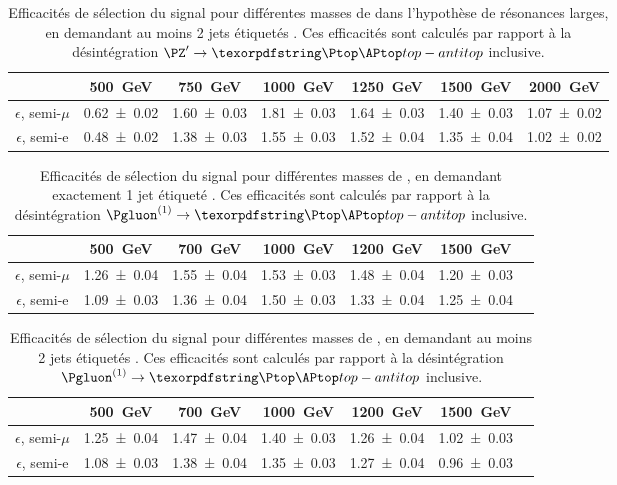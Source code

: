 \begin{table}[p!] \centering
  \begin{tabular}{ccccccc} \toprule
    & \SI{500}{\GeV} & \SI{750}{\GeV} & \SI{1000}{\GeV} & \SI{1250}{\GeV} & \SI{1500}{\GeV} & \SI{2000}{\GeV} \\ \midrule
    $\epsilon$, semi-$\mu$ & \num{0.62 \pm 0.02} & \num{1.60 \pm 0.03} & \num{1.81 \pm 0.03} & \num{1.64 \pm 0.03} & \num{1.40 \pm 0.03} & \num{1.07 \pm 0.02} \\
    $\epsilon$, semi-e & \num{0.48 \pm 0.02} & \num{1.38 \pm 0.03} & \num{1.55 \pm 0.03} & \num{1.52 \pm 0.04} & \num{1.35 \pm 0.04} & \num{1.02 \pm 0.02} \\ \bottomrule
  \end{tabular}
  \caption{Efficacités de sélection du signal pour différentes masses de \zprime dans l'hypothèse de résonances larges, en demandant au moins 2 jets étiquetés \Pbottom. Ces efficacités sont calculés par rapport à la désintégration $\zprime \rightarrow \ttbar$ inclusive.}
  \label{tab:eff_large_2b}
\end{table}

\begin{table}[p!] \centering
  \begin{tabular}{ccccccc} \toprule
    & \SI{500}{\GeV} & \SI{700}{\GeV} & \SI{1000}{\GeV} & \SI{1200}{\GeV} & \SI{1500}{\GeV} \\ \midrule
    $\epsilon$, semi-$\mu$ & \num{1.26 \pm 0.04} & \num{1.55 \pm 0.04} & \num{1.53 \pm 0.03} & \num{1.48 \pm 0.04} & \num{1.20 \pm 0.03} \\
    $\epsilon$, semi-e & \num{1.09 \pm 0.03} & \num{1.36 \pm 0.04} & \num{1.50 \pm 0.03} & \num{1.33 \pm 0.04} & \num{1.25 \pm 0.04} \\ \bottomrule
  \end{tabular}
  \caption{Efficacités de sélection du signal pour différentes masses de \kkglu, en demandant exactement 1 jet étiqueté \Pbottom. Ces efficacités sont calculés par rapport à la désintégration $\kkg \rightarrow \ttbar$ inclusive.}
  \label{tab:eff_kk_1b}
\end{table}

\begin{table}[tbp] \centering
  \begin{tabular}{ccccccc} \toprule
    & \SI{500}{\GeV} & \SI{700}{\GeV} & \SI{1000}{\GeV} & \SI{1200}{\GeV} & \SI{1500}{\GeV} \\ \midrule
    $\epsilon$, semi-$\mu$ & \num{1.25 \pm 0.04} & \num{1.47 \pm 0.04} & \num{1.40 \pm 0.03} & \num{1.26 \pm 0.04} & \num{1.02 \pm 0.03} \\
    $\epsilon$, semi-e & \num{1.08 \pm 0.03} & \num{1.38 \pm 0.04} & \num{1.35 \pm 0.03} & \num{1.27 \pm 0.04} & \num{0.96 \pm 0.03} \\ \bottomrule
  \end{tabular}
  \caption{Efficacités de sélection du signal pour différentes masses de \kkglu, en demandant au moins 2 jets étiquetés \Pbottom. Ces efficacités sont calculés par rapport à la désintégration $\kkg \rightarrow \ttbar$ inclusive.}
  \label{tab:eff_kk_2b}
\end{table}

